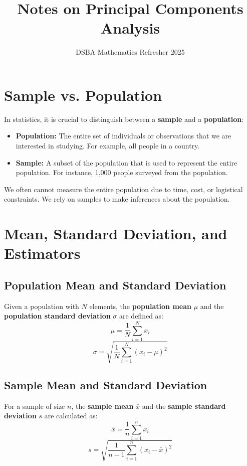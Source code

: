 \documentclass[]{article}
\title{Notes on Principal Components Analysis}
\author{DSBA Mathematics Refresher 2025}
\date{}
\begin{document}
	
	\maketitle
	
	\begin{abstract}
		
	\end{abstract}
	
	\section{Sample vs. Population}
	In statistics, it is crucial to distinguish between a \textbf{sample} and a \textbf{population}:
	\begin{itemize}
		\item \textbf{Population:}
		The entire set of individuals or observations that we are interested in studying. For example, all people in a country.
		\item \textbf{Sample:}
		A subset of the population that is used to represent the entire population. For instance, 1,000 people surveyed from the population.
	\end{itemize}
	
	We often cannot measure the entire population due to time, cost, or logistical constraints.
	We rely on samples to make inferences about the population.
	
	\section{Mean, Standard Deviation, and Estimators}
	\subsection{Population Mean and Standard Deviation}
	Given a population with $N$ elements, the \textbf{population mean} $\mu$ and the \textbf{population standard deviation} $\sigma$ are defined as:
	$$
	\mu = \frac{1}{N} \sum_{i=1}^N x_i
	$$
	$$
	\sigma = \sqrt{\frac{1}{N} \sum_{i=1}^N (x_i - \mu)^2}
	$$
	
	\subsection{Sample Mean and Standard Deviation}
	For a sample of size $n$, the \textbf{sample mean} $\bar{x}$ and the \textbf{sample standard deviation} $s$ are calculated as:
	$$
	\bar{x} = \frac{1}{n} \sum_{i=1}^n x_i
	$$
	$$
	s = \sqrt{\frac{1}{n-1} \sum_{i=1}^n (x_i - \bar{x})^2}
	$$
	
\end{document}
